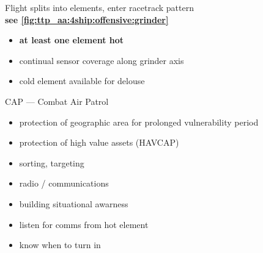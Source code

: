 
\begin{tcoloritemize}
    \blueitem[Grinder]
    Flight splits into elements, enter racetrack pattern\\
    \hfill\textbf{see \cref{fig:ttp_aa:4ship:offensive:grinder}}
    \begin{itemize}
        \item \textbf{at least one element hot}
        \item continual sensor coverage along grinder axis
        \item cold element available for delouse
    \end{itemize}

     CAP --- Combat Air Patrol 
    \begin{itemize}
        \item protection of geographic area for prolonged vulnerability period
        \item protection of high value assets (HAVCAP)
    \end{itemize}

    \begin{itemize}
        \item sorting, targeting
        \item radio / communications
    \end{itemize}

    \begin{itemize}
        \item building situational awarness
        \item listen for comms from hot element
        \item know when to turn in
    \end{itemize}
\end{tcoloritemize}


